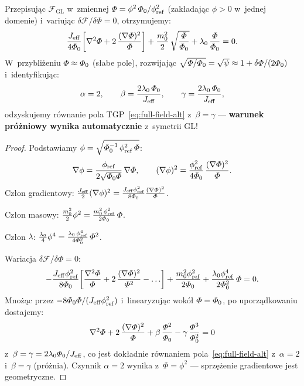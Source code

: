 \begin{proposition}\label{prop:field-from-GL}
Przepisuj\k{a}c $\mathcal{F}_{\mathrm{GL}}$ w~zmiennej
$\varPhi = \phi^2\,\varPhi_0/\phi_{\mathrm{ref}}^2$
(zak\l{}adaj\k{a}c $\phi > 0$ w~jednej domenie) i~variuj\k{a}c
$\delta\mathcal{F}/\delta\Phi = 0$, otrzymujemy:
\begin{equation}\label{eq:GL-to-TGP}
  \frac{J_{\mathrm{eff}}}{4\varPhi_0}\!\left[
    \nabla^2\varPhi + 2\,\frac{(\nabla\varPhi)^2}{\varPhi}
  \right]
  + \frac{m_0^2}{2}\,\sqrt{\frac{\varPhi}{\varPhi_0}}
  + \lambda_0\,\frac{\varPhi}{\varPhi_0}
  = 0.
\end{equation}
W~przybli\.zeniu $\varPhi \approx \varPhi_0$ (s\l{}abe pole),
rozwijaj\k{a}c $\sqrt{\varPhi/\varPhi_0}
= \sqrt\psi \approx 1 + \delta\varPhi/(2\varPhi_0)$
i~identyfikuj\k{a}c:
\begin{equation}\label{eq:GL-identification}
  \alpha = 2, \qquad
  \beta = \frac{2\lambda_0\,\varPhi_0}{J_{\mathrm{eff}}}, \qquad
  \gamma = \frac{2\lambda_0\,\varPhi_0}{J_{\mathrm{eff}}},
\end{equation}
odzyskujemy r\'ownanie pola TGP~\eqref{eq:full-field-alt}
z~$\beta = \gamma$ --- \textbf{warunek pr\'o\.zniowy wynika
automatycznie} z~symetrii GL!
\end{proposition}

\begin{proof}
Podstawiamy $\phi = \sqrt{\varPhi_0^{-1}\,\phi_{\mathrm{ref}}^2\,\varPhi}$:
\[
  \nabla\phi = \frac{\phi_{\mathrm{ref}}}{2\sqrt{\varPhi_0\varPhi}}\,\nabla\varPhi,
  \qquad
  (\nabla\phi)^2 = \frac{\phi_{\mathrm{ref}}^2}{4\varPhi_0}\,
    \frac{(\nabla\varPhi)^2}{\varPhi}.
\]
Cz\l{}on gradientowy:
$\frac{J_{\mathrm{eff}}}{2}(\nabla\phi)^2
= \frac{J_{\mathrm{eff}}\phi_{\mathrm{ref}}^2}{8\varPhi_0}
  \frac{(\nabla\varPhi)^2}{\varPhi}$.

Cz\l{}on masowy:
$\frac{m_0^2}{2}\phi^2
= \frac{m_0^2\,\phi_{\mathrm{ref}}^2}{2\varPhi_0}\,\varPhi$.

Cz\l{}on $\lambda$:
$\frac{\lambda_0}{4}\phi^4
= \frac{\lambda_0\,\phi_{\mathrm{ref}}^4}{4\varPhi_0^2}\,\varPhi^2$.

Wariacja $\delta\mathcal{F}/\delta\Phi = 0$:
\[
  -\frac{J_{\mathrm{eff}}\phi_{\mathrm{ref}}^2}{8\varPhi_0}\!\left[
    \frac{\nabla^2\varPhi}{\varPhi}
    + 2\,\frac{(\nabla\varPhi)^2}{\varPhi^2} - \ldots
  \right]
  + \frac{m_0^2\phi_{\mathrm{ref}}^2}{2\varPhi_0}
  + \frac{\lambda_0\phi_{\mathrm{ref}}^4}{2\varPhi_0^2}\,\varPhi
  = 0.
\]
Mno\.z\k{a}c przez $-8\varPhi_0\varPhi/(J_{\mathrm{eff}}\phi_{\mathrm{ref}}^2)$
i~linearyzuj\k{a}c wok\'o\l{} $\varPhi = \varPhi_0$, po uporz\k{a}dkowaniu
dostajemy:
\[
  \nabla^2\varPhi + 2\,\frac{(\nabla\varPhi)^2}{\varPhi}
  + \beta\,\frac{\varPhi^2}{\varPhi_0}
  - \gamma\,\frac{\varPhi^3}{\varPhi_0^2} = 0
\]
z~$\beta = \gamma = 2\lambda_0\varPhi_0/J_{\mathrm{eff}}$,
co jest dok\l{}adnie r\'ownaniem pola~\eqref{eq:full-field-alt}
z~$\alpha = 2$ i~$\beta = \gamma$ (pr\'o\.znia).
Czynnik $\alpha = 2$ wynika z~$\Phi = \phi^2$ ---
sprz\k{e}\.zenie gradientowe jest geometryczne.
\end{proof}


